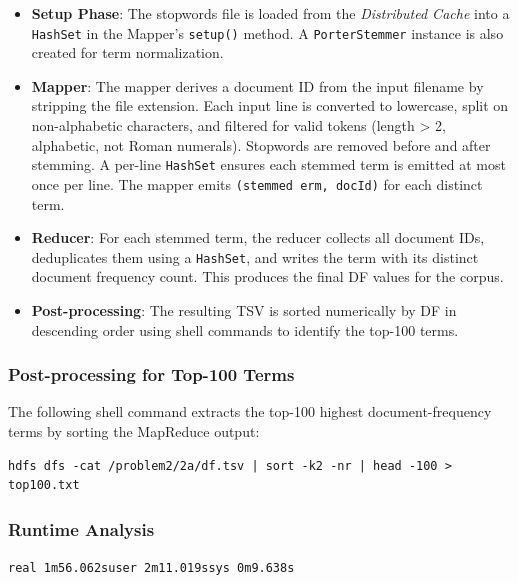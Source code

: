 \documentclass[12pt,a4paper]{article}
\newcommand{\runtime}[3]{%
  \texttt{real~#1\quad user~#2\quad sys~#3}%
}
\begin{document}
\begin{itemize}
    \item \textbf{Setup Phase}: The stopwords file is loaded from the \textit{Distributed Cache} into a \texttt{HashSet} in the Mapper's \texttt{setup()} method. A \texttt{PorterStemmer} instance is also created for term normalization.
    \item \textbf{Mapper}: The mapper derives a document ID from the input filename by stripping the file extension. Each input line is converted to lowercase, split on non-alphabetic characters, and filtered for valid tokens (length > 2, alphabetic, not Roman numerals). Stopwords are removed before and after stemming. A per-line \texttt{HashSet} ensures each stemmed term is emitted at most once per line. The mapper emits \texttt{(stemmed	erm, docId)} for each distinct term.
    \item \textbf{Reducer}: For each stemmed term, the reducer collects all document IDs, deduplicates them using a \texttt{HashSet}, and writes the term with its distinct document frequency count. This produces the final DF values for the corpus.
    \item \textbf{Post-processing}: The resulting TSV is sorted numerically by DF in descending order using shell commands to identify the top-100 terms.
\end{itemize}



\subsubsection{Post-processing for Top-100 Terms}

The following shell command extracts the top-100 highest document-frequency terms by sorting the MapReduce output:

\begin{lstlisting}[style=bashcode]
hdfs dfs -cat /problem2/2a/df.tsv | sort -k2 -nr | head -100 > top100.txt
\end{lstlisting}
\subsubsection{Runtime Analysis}

\begin{infobox}
  \runtime{1m56.062s}{2m11.019s}{0m9.638s}
  \vspace{0.5em}
\end{infobox}
\end{document}
